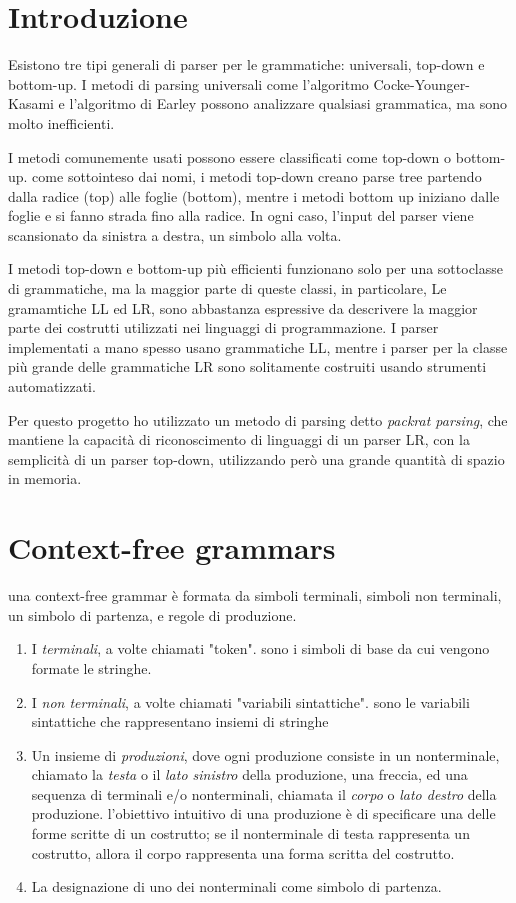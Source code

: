 \section{Introduzione}
Esistono tre tipi generali di parser per le grammatiche: universali, top-down e bottom-up. I metodi di parsing universali come l'algoritmo Cocke-Younger-Kasami e l'algoritmo di Earley possono analizzare qualsiasi grammatica, ma sono molto inefficienti.

I metodi comunemente usati possono essere classificati come top-down o bottom-up. come sottointeso dai nomi, i metodi top-down creano parse tree partendo dalla radice (top) alle foglie (bottom), mentre i metodi bottom up iniziano dalle foglie e si fanno strada fino alla radice. In ogni caso, l'input del parser viene scansionato da sinistra a destra, un simbolo alla volta.

I metodi top-down e bottom-up più efficienti funzionano solo per una sottoclasse di grammatiche, ma la maggior parte di queste classi, in particolare, Le gramamtiche LL ed LR, sono abbastanza espressive da descrivere la maggior parte dei costrutti utilizzati nei linguaggi di programmazione. I parser implementati a mano spesso usano grammatiche LL, mentre i parser per la classe più grande delle grammatiche LR sono solitamente costruiti usando strumenti automatizzati.

Per questo progetto ho utilizzato un metodo di parsing detto \textit{packrat parsing}, che mantiene la capacità di riconoscimento di linguaggi di un parser LR, con la semplicità di un parser top-down, utilizzando però una grande quantità di spazio in memoria.

\section{Context-free grammars}
una context-free grammar è formata da simboli terminali, simboli non terminali, un simbolo di partenza, e regole di produzione.
\begin{enumerate}
	\item I \textit{terminali}, a volte chiamati "token". sono i simboli di base da cui vengono formate le stringhe.
	\item I \textit{non terminali}, a volte chiamati "variabili sintattiche". sono le variabili sintattiche che rappresentano insiemi di stringhe
	\item Un insieme di \textit{produzioni}, dove ogni produzione consiste in un nonterminale, chiamato la \textit{testa} o il   \textit{lato sinistro} della produzione, una freccia, ed una sequenza di terminali e/o nonterminali, chiamata il \textit{corpo} o \textit{lato destro} della produzione. l'obiettivo intuitivo di una produzione è di specificare una delle forme scritte  di un costrutto; se il nonterminale di testa rappresenta un costrutto, allora il corpo rappresenta una forma scritta del costrutto.
	\item La designazione di uno dei nonterminali come simbolo di partenza.
\end{enumerate}

